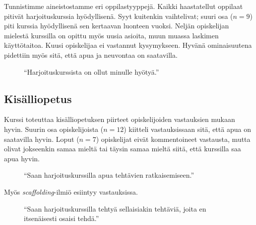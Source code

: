 Tunnistimme aineistostamme eri oppilastyyppejä.
Kaikki haastatellut oppilaat pitivät harjoituskurssia hyödyllisenä.
Syyt kuitenkin vaihtelivat; suuri osa ($n=9$) piti kurssia hyödyllisenä sen kertaavan luonteen vuoksi.
Neljän opiskelijan mielestä kurssilla on opittu myös uusia asioita, muun muassa laskimen käyttötaitoa.
Kuusi opiskelijaa ei vastannut kysymykseen.
Hyvänä ominaisuutena pidettiin myös sitä, että apua ja neuvontaa on saatavilla.

\begin{figure}[h!]
\centering
{}
\caption{``Harjoituskurssista on ollut minulle hyötyä.''}
\end{figure}

\subsection{Kisälliopetus}
Kurssi toteuttaa kisälliopetuksen piirteet opiskelijoiden vastauksien mukaan hyvin.
Suurin osa opiskelijoista ($n=12$) kiitteli vastauksissaan sitä, että apua on saatavilla hyvin.
Loput ($n=7$) opiskelijat eivät kommentoineet vastausta, mutta olivat jokseenkin samaa mieltä tai täysin samaa mieltä siitä, että kurssilla saa apua hyvin.

\begin{figure}[h!]
\centering
{}
\caption{``Saan harjoituskurssilla apua tehtävien ratkaisemiseen.''}
\end{figure}

Myös \emph{scaffolding}-ilmiö esiintyy vastauksissa.

\begin{figure}[h!]
\centering
{}
\caption{``Saan harjoituskurssilla tehtyä sellaisiakin tehtäviä, joita en itsenäisesti osaisi tehdä.''}
\end{figure}


